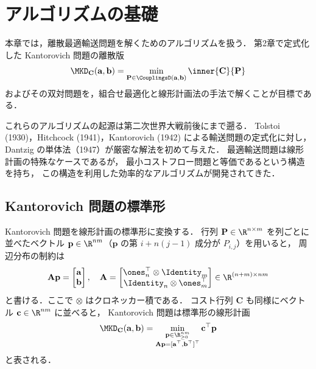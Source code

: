 \chapter{アルゴリズムの基礎}
\label{ch:algorithmic-foundations}

本章では，離散最適輸送問題を解くためのアルゴリズムを扱う．
第2章で定式化した Kantorovich 問題の離散版
\[
  \MKD_{\mathbf{C}}(\mathbf{a}, \mathbf{b})
  = \min_{\mathbf{P} \in \CouplingsD(\mathbf{a}, \mathbf{b})}
  \inner{\mathbf{C}}{\mathbf{P}}
\]
およびその双対問題を，組合せ最適化と線形計画法の手法で解くことが目標である．

これらのアルゴリズムの起源は第二次世界大戦前後にまで遡る．
Tolstoi (1930)，Hitchcock (1941)，Kantorovich (1942) による輸送問題の定式化に対し，
Dantzig の単体法（1947）が厳密な解法を初めて与えた．
最適輸送問題は線形計画の特殊なケースであるが，
最小コストフロー問題と等価であるという構造を持ち，
この構造を利用した効率的なアルゴリズムが開発されてきた．

\section{Kantorovich 問題の標準形}
\label{sec:standard-form}

Kantorovich 問題を線形計画の標準形に変換する．
行列 $\mathbf{P} \in \R^{n \times m}$ を列ごとに並べたベクトル
$\mathbf{p} \in \R^{nm}$（$\mathbf{p}$ の第 $i + n(j-1)$ 成分が $P_{i,j}$）を用いると，
周辺分布の制約は
\[
  \mathbf{A} \mathbf{p}
  = \begin{bmatrix} \mathbf{a} \\ \mathbf{b} \end{bmatrix},
  \quad
  \mathbf{A} =
  \begin{bmatrix}
    \ones_n^\top \otimes \Identity_m \\
    \Identity_n \otimes \ones_m^\top
  \end{bmatrix}
  \in \R^{(n+m) \times nm}
\]
と書ける．ここで $\otimes$ はクロネッカー積である．
コスト行列 $\mathbf{C}$ も同様にベクトル $\mathbf{c} \in \R^{nm}$ に並べると，
Kantorovich 問題は標準形の線形計画
\[
  \MKD_{\mathbf{C}}(\mathbf{a}, \mathbf{b})
  = \min_{\substack{\mathbf{p} \in \R_{\geq 0}^{nm} \\
  \mathbf{A}\mathbf{p} = [\mathbf{a}^\top, \mathbf{b}^\top]^\top}}
  \mathbf{c}^\top \mathbf{p}
\]
と表される．

